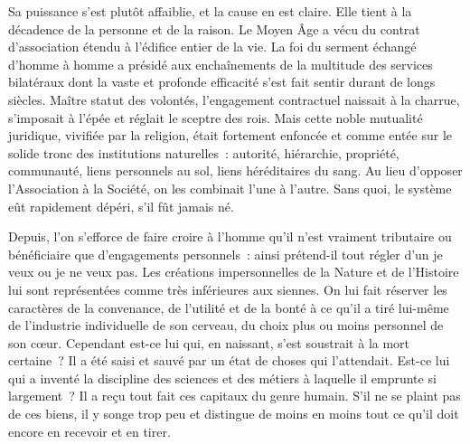 \documentclass[french,twoside]{book} %
\begin{document}
Sa puissance s’est plutôt affaiblie, et la cause en est claire. Elle tient à la décadence de la personne et de la raison. Le Moyen Âge a vécu du contrat d’association étendu à l’édifice entier de la vie. La foi du serment échangé d’homme à homme a présidé aux enchaînements de la multitude des services bilatéraux dont la vaste et profonde efficacité s’est fait sentir durant de longs siècles. Maître statut des volontés, l’engagement contractuel naissait à la charrue, s’imposait à l’épée et réglait le sceptre des rois. Mais cette noble mutualité juridique, vivifiée par la religion, était fortement enfoncée et comme entée sur le solide tronc des institutions naturelles : autorité, hiérarchie, propriété, communauté, liens personnels au sol, liens héréditaires du sang. Au lieu d’opposer l’Association à la Société, on les combinait l’une à l’autre. Sans quoi, le système eût rapidement dépéri, s’il fût jamais né.\par
Depuis, l’on s’efforce de faire croire à l’homme qu’il n’est vraiment tributaire ou bénéficiaire que d’engagements personnels : ainsi prétend-il tout régler d’un je veux ou je ne veux pas. Les créations impersonnelles de la Nature et de l’Histoire lui sont représentées comme très inférieures aux siennes. On lui fait réserver les caractères de la convenance, de l’utilité et de la bonté à ce qu’il a tiré lui-même de l’industrie individuelle de son cerveau, du choix plus ou moins personnel de son cœur. Cependant est-ce lui qui, en naissant, s’est soustrait à la mort certaine ? Il a été saisi et sauvé par un état de choses qui l’attendait. Est-ce lui qui a inventé la discipline des sciences et des métiers à laquelle il emprunte si largement ? Il a reçu tout fait ces capitaux du genre humain. S’il ne se plaint pas de ces biens, il y songe trop peu et distingue de moins en moins tout ce qu’il doit encore en recevoir et en tirer.
\end{document}
